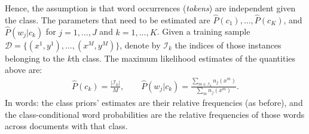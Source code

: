 Hence, the assumption is that word occurrences (\emph{tokens}) are independent given the class. 
The parameters that need to be estimated are ${\hat P}(c_1),\ldots,{\hat P}(c_K)$, and ${\hat P}(w_j|c_k)$ for $j=1,\ldots,J$ and $k=1,\ldots,K$. 
Given a training sample $\mathcal{D} = \{(x^{1},y^{1}),\ldots,(x^{M},y^{M})\}$, 
denote by $\mathcal{I}_k$ the indices of those instances belonging to the $k$th class. 
The maximum likelihood estimates of the quantities above are: 
\begin{eqnarray}\label{eq:mlemultinomial}
{\hat P}(c_k) = \frac{|\mathcal{I}_k|}{M}, \qquad
{\hat P}(w_j|c_k) = \frac{\sum_ {m \in \mathcal{I}_k} n_j(x^m)}{\sum_ {m} n_j(x^m)}.
\end{eqnarray}
In words: the class priors' estimates are their relative frequencies (as before), and 
the class-conditional word probabilities are the relative frequencies of those words across documents with that class.




